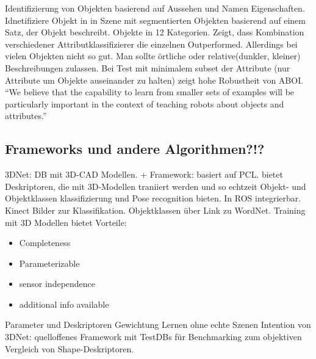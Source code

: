 \par

\cite{atrBasedObjIden} \newline
Identifizierung von Objekten basierend auf Aussehen und Namen Eigenschaften. \newline
Idnetifiziere Objekt in in Szene mit segmentierten Objekten basierend auf einem Satz, der Objekt beschreibt.  Objekte in 12 Kategorien. \newline
Zeigt, dass Kombination verschiedener Attributklassifizierer die einzelnen Outperformed. Allerdings bei vielen Objekten nicht so gut. Man sollte örtliche oder relative(dunkler, kleiner) Beschreibungen zulassen. Bei Test mit minimalem subset der Attribute (nur Attribute um Objekte auseinander zu halten) zeigt hohe Robustheit von ABOI.
``We believe that the capability to learn from smaller sets
of examples will be particularly important in the context of
teaching robots about objects and attributes.'' \par

\subsection{Frameworks und andere Algorithmen?!?}

\cite{3dnet} \newline
3DNet: DB mit 3D-CAD Modellen. + Framework: basiert auf PCL. bietet Deskriptoren, die mit 3D-Modellen traniiert werden und so echtzeit Objekt- und Objektklassen klassifizierung und Pose recognition bieten. In ROS integrierbar. Kinect Bilder zur Klassifikation. \newline
Objektklassen über Link zu WordNet. \newline 
Training mit 3D Modellen bietet Vorteile: 
\begin{itemize}
	\item Completeness
	\item Parameterizable
	\item sensor independence
	\item additional info available
\end{itemize}
Parameter und Deskriptoren Gewichtung Lernen ohne echte Szenen \newline
Intention von 3DNet: quelloffenes Framework mit TestDBs für Benchmarking zum objektiven Vergleich von Shape-Deskriptoren. \par


